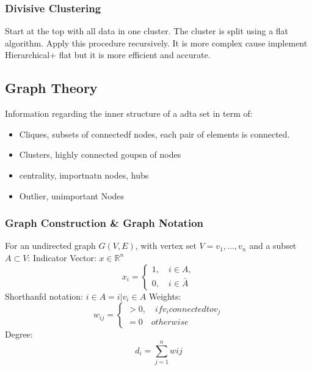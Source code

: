 \documentclass[unicode,11pt,a4paper,oneside,numbers=endperiod,openany]{scrartcl}
\begin{document}
\subsubsection{Divisive Clustering}
Start at the top with all data in one cluster. The cluster is split using a flat algorithm. Apply this procedure recursively. It is more complex cause implement Hierarchical+ flat but it is more efficient and accurate.


\subsection{Graph Theory}
Information regarding the inner structure of a adta set in term of:
\begin{itemize}
 \item {Cliques, subsets of connectedf nodes, each pair of elements is connected.}
 \item{Clusters, highly connected goupsn of nodes}
 \item{centrality, importnatn nodes, hubs}
 \item{Outlier, unimportant Nodes}
\end{itemize}

\subsubsection{Graph Construction \& Graph Notation}
For an undirected graph $G(V,E)$, with vertex set $V = {v_1,...,v_n}$ and a subset $A \subset V$:\newline \newline
Indicator Vector: $x \in \mathbb{R}^n$
\begin{equation}
         x_i =
         \begin{cases}
          1, \quad i \in A, \\
          0, \quad i \in \bar{A}
          \end{cases}
         \end{equation}
Shorthanfd notation: $i \in A = {i|v_i \in A}$
\newline
Weights:
\begin{equation}
 w_{ij} = \begin{cases}
           >0, \quad if v_i connected to v_j \\
           = 0 \quad otherwise
          \end{cases}
\end{equation}
Degree:\newline
\[
 d_i = \sum^n_{j=1}w{ij}
\]
\end{document}
